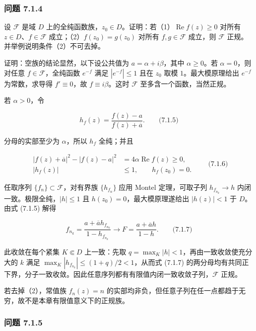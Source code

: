 \documentclass[11pt,a4paper]{article}
\begin{document}
\subsubsection{问题 7.1.4}\label{ch07-s1-ux95eeux9898-714}

设 \(\mathcal F\) 是域 \(D\)
上的全纯函数族，\(z_0\in D\)。证明：若（1）\(\operatorname{Re}f(z)\ge0\)
对所有 \(z\in D\)、\(f\in\mathcal F\) 成立；（2）\(f(z_0)=g(z_0)\)
对所有 \(f,g\in\mathcal F\) 成立，则 \(\mathcal F\)
正规。并举例说明条件（2）不可去掉。

证明：空族的结论显然，以下设公共值为 \(a=\alpha+i\beta\)，其中
\(\alpha\ge0\)。若 \(\alpha=0\)，则对任意 \(f\in\mathcal F\)，全纯函数
\(e^{-f}\) 满足 \(|e^{-f}|\le1\) 且在 \(z_0\) 取模 \(1\)。最大模原理给出
\(e^{-f}\) 为常数，求导得 \(f'\equiv0\)，故 \(f\equiv i\beta\)。这时
\(\mathcal F\) 至多含一个函数，当然正规。

若 \(\alpha>0\)，令

\[
h_f(z)=\frac{f(z)-a}{f(z)+\overline a}.
\qquad\text{(7.1.5)}
\]

分母的实部至少为 \(\alpha\)，所以 \(h_f\) 全纯；并且

\[
\begin{aligned}
|f(z)+\overline a|^2-|f(z)-a|^2
&=4\alpha\operatorname{Re}f(z)\ge0,\\
|h_f(z)|&\le1,\qquad h_f(z_0)=0.
\end{aligned}
\qquad\text{(7.1.6)}
\]

任取序列 \(\{f_n\}\subset\mathcal F\)，对有界族 \(\{h_{f_n}\}\) 应用
Montel 定理，可取子列 \(h_{f_{n_k}}\to h\)
内闭一致。极限全纯，\(|h|\le1\) 且 \(h(z_0)=0\)，最大模原理遂给出
\(|h(z)|<1\) 于 \(D\)。由式 (7.1.5) 解得

\[
f_{n_k}=\frac{a+\overline a h_{f_{n_k}}}{1-h_{f_{n_k}}}
\longrightarrow F=\frac{a+\overline a h}{1-h}.
\qquad\text{(7.1.7)}
\]

此收敛在每个紧集 \(K\Subset D\) 上一致：先取
\(q=\max_K|h|<1\)，再由一致收敛使充分大的 \(k\) 满足
\(\max_K|h_{f_{n_k}}|\le(1+q)/2<1\)，从而式 (7.1.7)
的两分母均有共同正下界，分子一致收敛。因此任意序列都有有限值内闭一致收敛子列，\(\mathcal F\)
正规。

若去掉（2），常值族 \(f_n(z)=n\)
的实部均非负，但任意子列在任一点都趋于无穷，故不是本章有限值意义下的正规族。

\subsubsection{问题 7.1.5}\label{ch07-s1-ux95eeux9898-715}
\end{document}
